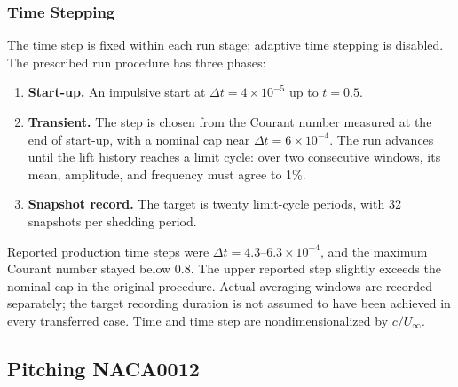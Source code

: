\subsubsection{Time Stepping}
The time step is fixed within each run stage; adaptive time stepping is disabled. The prescribed run procedure has three phases:
\begin{enumerate}
\item \textbf{Start-up.} An impulsive start at $\Delta t=4\times10^{-5}$ up to $t=0.5$.
\item \textbf{Transient.} The step is chosen from the Courant number measured at the end of start-up, with a nominal cap near $\Delta t=6\times10^{-4}$. The run advances until the lift history reaches a limit cycle: over two consecutive windows, its mean, amplitude, and frequency must agree to 1\%.
\item \textbf{Snapshot record.} The target is twenty limit-cycle periods, with 32 snapshots per shedding period.
\end{enumerate}
Reported production time steps were $\Delta t=4.3$--$6.3\times10^{-4}$, and the maximum Courant number stayed below 0.8. The upper reported step slightly exceeds the nominal cap in the original procedure. Actual averaging windows are recorded separately; the target recording duration is not assumed to have been achieved in every transferred case. Time and time step are nondimensionalized by $c/U_\infty$.

\FloatBarrier
\subsection{Pitching NACA0012}
